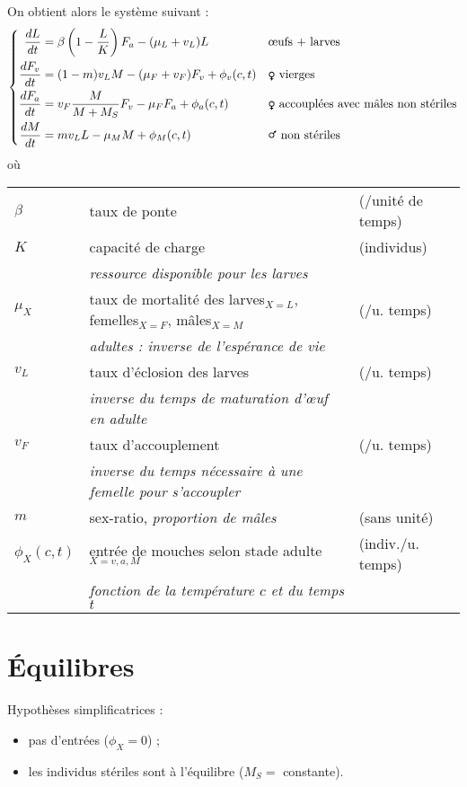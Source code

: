 \documentclass[11pt,twoside]{article}
\begin{document}
On obtient alors le système suivant :
\begin{equation}
  \label{eq:sys}
  \left\{
  \begin{aligned}
    \frac{d L}{dt} &= \beta \left(1 - \frac{L}{K} \right) F_a - (\mu_L+v_L) L &&\text{œufs + larves}\\
    \frac{d F_v}{dt} &= (1-m) v_L M - (\mu_F+v_F) F_v + \phi_v(c,t) &&\text{\Female\ vierges}\\
    \frac{d F_a}{dt} &= v_F \frac{M}{M+M_S} F_v -\mu_F F_a + \phi_a(c,t) &&\text{\Female\ accouplées avec mâles non stériles} \\
    \frac{d M}{dt} &= mv_L L - \mu_M M + \phi_M(c,t) &&\text{\Male\ non stériles} \\
  \end{aligned}
\right.
\end{equation}
où
\begin{tabular}[t]{lll}
  $\beta$ & taux de ponte &(/unité de temps) \\
  $K$ & capacité de charge &(individus) \\
          & \emph{ressource disponible pour les larves} \\
  $\mu_X$ & taux de mortalité des larves$_{X=L}$, femelles$_{X=F}$, mâles$_{X=M}$ &(/u. temps) \\
          & \emph{adultes : inverse de l'espérance de vie} \\
  $v_L$ & taux d'éclosion des larves  &(/u. temps) \\
          & \emph{inverse du temps de maturation d'œuf en adulte} \\
  $v_F$ &  taux d'accouplement &(/u. temps)\\
          & \emph{inverse du temps nécessaire à une femelle pour s'accoupler} \\
  $m$ & sex-ratio, \emph{proportion de mâles} &(sans unité) \\
  $\phi_X(c,t)$ & entrée de mouches selon stade adulte $_{X=v,a,M}$ &(indiv./u. temps) \\
          & \emph{fonction de la température $c$ et du temps $t$}
\end{tabular}


\section{Équilibres}

Hypothèses simplificatrices :
\begin{itemize}
\item pas d'entrées ($\phi_X=0$) ;
\item les individus stériles sont à l'équilibre ($M_S=$ constante).
\end{itemize}
\end{document}
